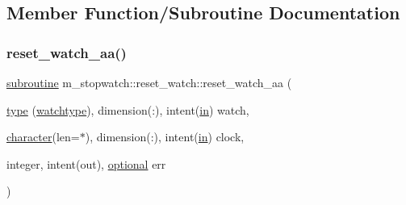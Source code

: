 \subsection{Member Function/\+Subroutine Documentation}
\mbox{\label{interfacem__stopwatch_1_1reset__watch_a46c154eaa914897d9bc309350d28a5d7}} 
\subsubsection{\texorpdfstring{reset\+\_\+watch\+\_\+aa()}{reset\_watch\_aa()}}
{\footnotesize\ttfamily \hyperlink{M__stopwatch_83_8txt_acfbcff50169d691ff02d4a123ed70482}{subroutine} m\+\_\+stopwatch\+::reset\+\_\+watch\+::reset\+\_\+watch\+\_\+aa (\begin{DoxyParamCaption}\item[{\hyperlink{stop__watch_83_8txt_a70f0ead91c32e25323c03265aa302c1c}{type} (\hyperlink{structm__stopwatch_1_1watchtype}{watchtype}), dimension(\+:), intent(\hyperlink{M__journal_83_8txt_afce72651d1eed785a2132bee863b2f38}{in})}]{watch,  }\item[{\hyperlink{option__stopwatch_83_8txt_abd4b21fbbd175834027b5224bfe97e66}{character}(len=$\ast$), dimension(\+:), intent(\hyperlink{M__journal_83_8txt_afce72651d1eed785a2132bee863b2f38}{in})}]{clock,  }\item[{integer, intent(out), \hyperlink{option__stopwatch_83_8txt_aa4ece75e7acf58a4843f70fe18c3ade5}{optional}}]{err }\end{DoxyParamCaption})\hspace{0.3cm}{\ttfamily [private]}}

\mbox{\label{interfacem__stopwatch_1_1reset__watch_ab44c6e38fa26c7aad501303ba7d02200}} 
